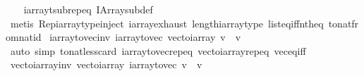 \begin{isabellebody}
%
\isadelimproof
\ \ %
\endisadelimproof
%
\isatagproof
{}\isamarkupfalse%
\ iarray{\isacharunderscore}{\kern0pt}t{\isacharunderscore}{\kern0pt}sub{\isachardot}{\kern0pt}rep{\isacharunderscore}{\kern0pt}eq\ IArray{\isachardot}{\kern0pt}sub{\isacharunderscore}{\kern0pt}def\isanewline
\ \ \isamarkupfalse%
\ {\isacharparenleft}{\kern0pt}metis\ Rep{\isacharunderscore}{\kern0pt}iarray{\isacharunderscore}{\kern0pt}type{\isacharunderscore}{\kern0pt}inject\ iarray{\isacharunderscore}{\kern0pt}exhaust{}\ length{\isacharunderscore}{\kern0pt}iarray{\isacharunderscore}{\kern0pt}type\ list{\isacharunderscore}{\kern0pt}eq{\isacharunderscore}{\kern0pt}iff{\isacharunderscore}{\kern0pt}nth{\isacharunderscore}{\kern0pt}eq\ to{\isacharunderscore}{\kern0pt}nat{\isacharunderscore}{\kern0pt}from{\isacharunderscore}{\kern0pt}nat{\isacharunderscore}{\kern0pt}id{\isacharparenright}{\kern0pt}%
\endisatagproof
{\isafoldproof}%
%
\isadelimproof
\isanewline
%
\endisadelimproof
\isanewline
{}\isamarkupfalse%
\ iarray{\isacharunderscore}{\kern0pt}to{\isacharunderscore}{\kern0pt}vec{\isacharunderscore}{\kern0pt}inv{\isacharcolon}{\kern0pt}\ {\isachardoublequoteopen}iarray{\isacharunderscore}{\kern0pt}to{\isacharunderscore}{\kern0pt}vec\ {\isacharparenleft}{\kern0pt}vec{\isacharunderscore}{\kern0pt}to{\isacharunderscore}{\kern0pt}iarray\ v{\isacharparenright}{\kern0pt}\ {\isacharequal}{\kern0pt}\ v{\isachardoublequoteclose}\isanewline
%
\isadelimproof
\ \ %
\endisadelimproof
%
\isatagproof
{}\isamarkupfalse%
\ {\isacharparenleft}{\kern0pt}auto\ simp{\isacharcolon}{\kern0pt}\ to{\isacharunderscore}{\kern0pt}nat{\isacharunderscore}{\kern0pt}less{\isacharunderscore}{\kern0pt}card\ iarray{\isacharunderscore}{\kern0pt}to{\isacharunderscore}{\kern0pt}vec{\isachardot}{\kern0pt}rep{\isacharunderscore}{\kern0pt}eq\ vec{\isacharunderscore}{\kern0pt}to{\isacharunderscore}{\kern0pt}iarray{\isachardot}{\kern0pt}rep{\isacharunderscore}{\kern0pt}eq\ vec{\isacharunderscore}{\kern0pt}eq{\isacharunderscore}{\kern0pt}iff{\isacharparenright}{\kern0pt}%
\endisatagproof
{\isafoldproof}%
%
\isadelimproof
\isanewline
%
\endisadelimproof
\isanewline
{}\isamarkupfalse%
\ vec{\isacharunderscore}{\kern0pt}to{\isacharunderscore}{\kern0pt}iarray{\isacharunderscore}{\kern0pt}inv{\isacharcolon}{\kern0pt}\ {\isachardoublequoteopen}vec{\isacharunderscore}{\kern0pt}to{\isacharunderscore}{\kern0pt}iarray\ {\isacharparenleft}{\kern0pt}iarray{\isacharunderscore}{\kern0pt}to{\isacharunderscore}{\kern0pt}vec\ v{\isacharparenright}{\kern0pt}\ {\isacharequal}{\kern0pt}\ v{\isachardoublequoteclose}\isanewline

\end{isabellebody}
